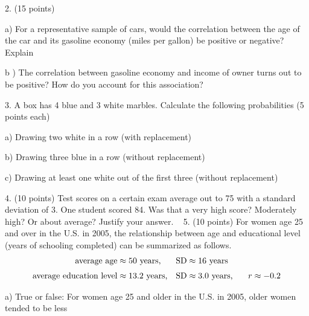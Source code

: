 \documentclass[10pt]{article}
\begin{document}
2. (15 points) 

\hspace{20pt} a) For a representative sample of cars, would the correlation between the
age of the car and its gasoline economy (miles per gallon) be positive or negative?  Explain
\vspace{1.75in}

\hspace{20pt} b ) The correlation between gasoline economy and income of owner turns out to 
be positive?  How do you account for this association?
\vspace{2in}

3. A box has 4 blue and 3 white marbles.  Calculate the following probabilities 
(5 points each)

\hspace{10pt} a) Drawing two white in a row (with replacement)
\vspace{.4in}

\hspace{10pt} b) Drawing three blue in a row (without replacement)
\vspace{0.4in}

\hspace{10pt} c) Drawing at least one white out of the first three (without replacement)
\vspace{1in}

4. (10 points) Test scores on a certain exam average out to 75 with a standard 
deviation of 3.  One student scored 84.   Was that a very high score?  Moderately high?  
Or about average?  Justify your answer.
\vfill
\eject
{\ }
5. (10 points) For women age 25 and over in the U.S. in 2005, the relationship between
age and educational level (years of schooling completed) can be summarized as
follows. 
\begin{align*}
\mbox{average age}         & \approx \mbox{50 years,}    & \mbox{SD} & \approx \mbox{16 years}\\[3pt]
\mbox{average education level}  & \approx \mbox{13.2 years,}  & \mbox{SD} & \approx \mbox{3.0 years,
   \hspace{15pt}} r\approx -0.2
\end{align*}

\hspace{20pt} a) True or false:  For women age 25 and older in the U.S. in 2005, older women tended 
to be less\vspace{-5pt}
\end{document}
